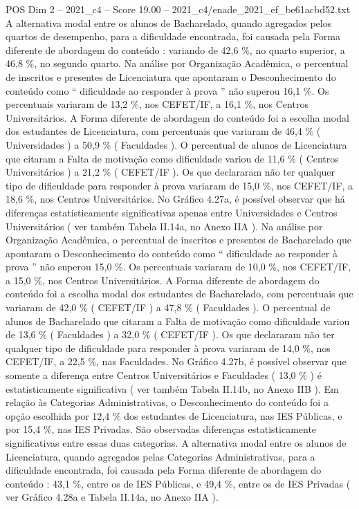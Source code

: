 \begin{textsample}{POS Dim 2 – 2021\_c4 – Score 19.00 – 2021\_c4/enade\_2021\_ef\_be61acbd52.txt}
A alternativa modal entre os alunos de Bacharelado, quando agregados pelos quartos de desempenho, para a dificuldade encontrada, foi causada pela Forma diferente de abordagem do conteúdo : variando de 42,6 \%, no quarto superior, a 46,8 \%, no segundo quarto.
Na análise por Organização Acadêmica, o percentual de inscritos e presentes de Licenciatura que apontaram o Desconhecimento do conteúdo como “ dificuldade ao responder à prova ” não superou 16,1 \%.
Os percentuais variaram de 13,2 \%, nos CEFET/IF, a 16,1 \%, nos Centros Universitários.
A Forma diferente de abordagem do conteúdo foi a escolha modal dos estudantes de Licenciatura, com percentuais que variaram de 46,4 \% ( Universidades ) a 50,9 \% ( Faculdades ).
O percentual de alunos de Licenciatura que citaram a Falta de motivação como dificuldade variou de 11,6 \% ( Centros Universitários ) a 21,2 \% ( CEFET/IF ).
Os que declararam não ter qualquer tipo de dificuldade para responder à prova variaram de 15,0 \%, nos CEFET/IF, a 18,6 \%, nos Centros Universitários.
No Gráfico 4.27a, é possível observar que há diferenças estatisticamente significativas apenas entre Universidades e Centros Universitários ( ver também Tabela II.14a, no Anexo IIA ).
Na análise por Organização Acadêmica, o percentual de inscritos e presentes de Bacharelado que apontaram o Desconhecimento do conteúdo como “ dificuldade ao responder à prova ” não superou 15,0 \%.
Os percentuais variaram de 10,0 \%, nos CEFET/IF, a 15,0 \%, nos Centros Universitários.
A Forma diferente de abordagem do conteúdo foi a escolha modal dos estudantes de Bacharelado, com percentuais que variaram de 42,0 \% ( CEFET/IF ) a 47,8 \% ( Faculdades ).
O percentual de alunos de Bacharelado que citaram a Falta de motivação como dificuldade variou de 13,6 \% ( Faculdades ) a 32,0 \% ( CEFET/IF ).
Os que declararam não ter qualquer tipo de dificuldade para responder à prova variaram de 14,0 \%, nos CEFET/IF, a 22,5 \%, nas Faculdades.
No Gráfico 4.27b, é possível observar que somente a diferença entre Centros Universitários e Faculdades ( 13,0 \% ) é estatisticamente significativa ( ver também Tabela II.14b, no Anexo IIB ).
Em relação às Categorias Administrativas, o Desconhecimento do conteúdo foi a opção escolhida por 12,4 \% dos estudantes de Licenciatura, nas IES Públicas, e por 15,4 \%, nas IES Privadas.
São observadas diferenças estatisticamente significativas entre essas duas categorias.
A alternativa modal entre os alunos de Licenciatura, quando agregados pelas Categorias Administrativas, para a dificuldade encontrada, foi causada pela Forma diferente de abordagem do conteúdo : 43,1 \%, entre os de IES Públicas, e 49,4 \%, entre os de IES Privadas ( ver Gráfico 4.28a e Tabela II.14a, no Anexo IIA ).

\end{textsample}
